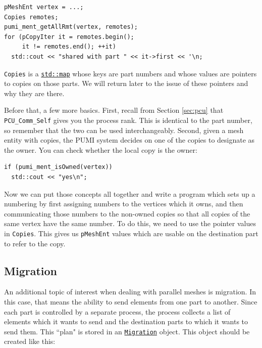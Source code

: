 \documentclass{article}
\begin{document}
{\begin{lstlisting}
pMeshEnt vertex = ...;
Copies remotes;
pumi_ment_getAllRmt(vertex, remotes);
for (pCopyIter it = remotes.begin();
     it != remotes.end(); ++it)
  std::cout << "shared with part " << it->first << '\n;
\end{lstlisting}

\texttt{Copies} is a
\href{http://www.cplusplus.com/reference/map/map/}{\texttt{std::map}}
whose keys are part numbers and whose
values are pointers to copies on those parts.
We will return later to the issue of these pointers and
why they are there.

Before that, a few more basics.
First, recall from Section \ref{sec:pcu} that \texttt{PCU\_Comm\_Self}
gives you the process rank.
This is identical to the part number, so remember that the two
can be used interchangeably.
Second, given a mesh entity with copies, the PUMI system decides
on one of the copies to designate as the owner.
You can check whether the local copy is the owner:

\begin{lstlisting}
if (pumi_ment_isOwned(vertex))
  std::cout << "yes\n";
\end{lstlisting}

Now we can put those concepts all together and write a program
which sets up a numbering by first assigning numbers to
the vertices which it owns, and then communicating those
numbers to the non-owned copies so that all copies
of the same vertex have the same number.
To do this, we need to use the pointer values in \texttt{Copies}.
This gives us \texttt{pMeshEnt} values which are usable
on the destination part to refer to the copy.



\subsection{Migration}

An additional topic of interest when dealing with parallel
meshes is migration.
In this case, that means the ability to send elements
from one part to another.
Since each part is controlled by a separate process,
the process collects a list of elements which it
wants to send and the destination parts to which
it wants to send them.
This ``plan" is stored in an
\href{http://scorec.rpi.edu/~dibanez/core/classapf_1_1Migration.html}{\texttt{Migration}}
object.
This object should be created like this:

}
\end{document}
